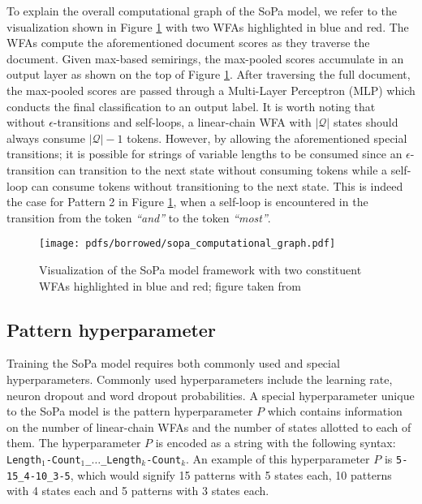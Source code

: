 \label{section:sopa_cg}

To explain the overall computational graph of the SoPa model, we refer to the
visualization shown in Figure \ref{fig:sopa} with two WFAs highlighted in blue and
red. The WFAs compute the aforementioned document scores as they traverse the document.
Given max-based semirings, the max-pooled scores accumulate in an output layer
as shown on the top of Figure \ref{fig:sopa}. After traversing the full
document, the max-pooled scores are passed through a Multi-Layer Perceptron
(MLP) which conducts the final classification to an output label. It is worth
noting that without $\epsilon$-transitions and self-loops, a linear-chain WFA
with $|\mathcal{Q}|$ states should always consume $\mathcal{|Q|}-1$ tokens.
However, by allowing the aforementioned special transitions; it is possible for
strings of variable lengths to be consumed since an $\epsilon$-transition can
transition to the next state without consuming tokens while a self-loop can
consume tokens without transitioning to the next state. This is indeed the case
for Pattern 2 in Figure \ref{fig:sopa}, when a self-loop is encountered in the
transition from the token \textit{``and''} to the token \textit{``most''}.

\begin{figure}[t]
  \centering
  \texttt{[image: pdfs/borrowed/sopa\_computational\_graph.pdf]}
  \caption{Visualization of the SoPa model framework with two constituent
    WFAs highlighted in blue and red; figure taken from
    \citet{schwartz2018sopa}}
  \label{fig:sopa}
\end{figure}

\subsection{Pattern hyperparameter}

Training the SoPa model requires both commonly used and special hyperparameters.
Commonly used hyperparameters include the learning rate, neuron dropout and word
dropout probabilities. A special hyperparameter unique to the SoPa model is the
pattern hyperparameter $P$ which contains information on the number of
linear-chain WFAs and the number of states allotted to each of them. The
hyperparameter $P$ is encoded as a string with the following syntax:
\texttt{Length$_{1}$-Count$_{1}$\_$\dots$\_Length$_{k}$-Count$_{k}$}. An example
of this hyperparameter $P$ is \texttt{5-15\_4-10\_3-5}, which would signify 15
patterns with 5 states each, 10 patterns with 4 states each and 5 patterns with
3 states each.

